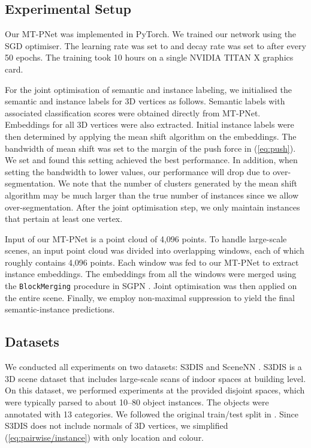 \documentclass[10pt,twocolumn,letterpaper]{article}
\begin{document}
\subsection{Experimental Setup}

Our MT-PNet was implemented in PyTorch. We trained our network using the SGD
optimiser. The learning rate was set to  and decay rate was set to 
after every 50 epochs. The training took 10 hours on a single NVIDIA TITAN X
graphics card.

For the joint optimisation of semantic and instance labeling, we initialised the
semantic and instance labels for 3D vertices as follows. Semantic labels with
associated classification scores were obtained directly from MT-PNet.
Embeddings for all 3D vertices were also extracted. Initial instance labels were
then determined by applying the mean shift algorithm
\cite{comaniciu-meanshift-pami02} on the embeddings. The bandwidth of mean shift
was set to the margin of the push force  in (\ref{eq:push}). We set
 and found this setting achieved the best performance. In
addition, when setting the bandwidth to lower values, our performance will drop
due to over-segmentation. We note that the number of clusters generated by the
mean shift algorithm may be much larger than the true number of instances since
we allow over-segmentation. After the joint optimisation step, we only maintain
instances that pertain at least one vertex.

Input of our MT-PNet is a point cloud of 4,096 points. To handle large-scale
scenes, an input point cloud was divided into overlapping windows, each of which
roughly contains 4,096 points. Each window was fed to our MT-PNet to extract
instance embeddings. The embeddings from all the windows were merged using the
\texttt{BlockMerging} procedure in SGPN \cite{wang-sgpn-cvpr18}. Joint
optimisation was then applied on the entire scene. Finally, we employ
non-maximal suppression to yield the final semantic-instance predictions.

\subsection{Datasets}
We conducted all experiments on two datasets: S3DIS \cite{armeni-s3dis-cvpr16}
and SceneNN \cite{hua-scenenn-3dv16}. S3DIS is a 3D scene dataset that includes
large-scale scans of indoor spaces at building level. On this dataset, we
performed experiments at the provided disjoint spaces, which were typically
parsed to about 10--80 object instances. The objects were annotated with 13
categories. We followed the original train/test split in
\cite{armeni-s3dis-cvpr16}. Since S3DIS does not include normals of 3D
vertices, we simplified (\ref{eq:pairwise/instance}) with only location and
colour.
\end{document}
